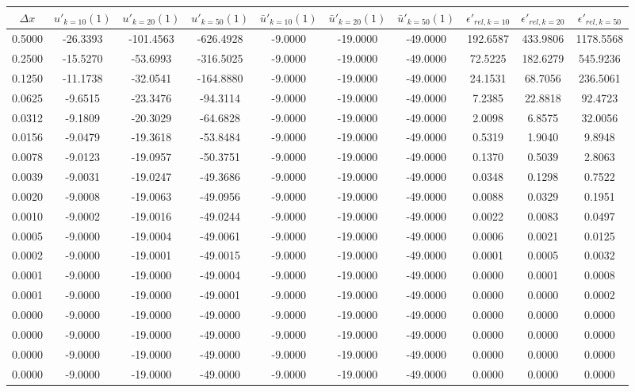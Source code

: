 \begin{tabular}{|c|c|c|c|c|c|c|c|c|c|}
\hline
\textbf{$\Delta x$}&\textbf{$u'_{k=10}(1)$}&\textbf{$u'_{k=20}(1)$}&\textbf{$u'_{k=50}(1)$}&\textbf{$\bar{u}'_{k=10}(1)$}&\textbf{$\bar{u}'_{k=20}(1)$}&\textbf{$\bar{u}'_{k=50}(1)$}&\textbf{$\epsilon'_{rel,k=10}$}&\textbf{$\epsilon'_{rel,k=20}$}&\textbf{$\epsilon'_{rel,k=50}$}\\\hline
0.5000&-26.3393&-101.4563&-626.4928&-9.0000&-19.0000&-49.0000&192.6587&433.9806&1178.5568\\\hline
0.2500&-15.5270&-53.6993&-316.5025&-9.0000&-19.0000&-49.0000&72.5225&182.6279&545.9236\\\hline
0.1250&-11.1738&-32.0541&-164.8880&-9.0000&-19.0000&-49.0000&24.1531&68.7056&236.5061\\\hline
0.0625&-9.6515&-23.3476&-94.3114&-9.0000&-19.0000&-49.0000&7.2385&22.8818&92.4723\\\hline
0.0312&-9.1809&-20.3029&-64.6828&-9.0000&-19.0000&-49.0000&2.0098&6.8575&32.0056\\\hline
0.0156&-9.0479&-19.3618&-53.8484&-9.0000&-19.0000&-49.0000&0.5319&1.9040&9.8948\\\hline
0.0078&-9.0123&-19.0957&-50.3751&-9.0000&-19.0000&-49.0000&0.1370&0.5039&2.8063\\\hline
0.0039&-9.0031&-19.0247&-49.3686&-9.0000&-19.0000&-49.0000&0.0348&0.1298&0.7522\\\hline
0.0020&-9.0008&-19.0063&-49.0956&-9.0000&-19.0000&-49.0000&0.0088&0.0329&0.1951\\\hline
0.0010&-9.0002&-19.0016&-49.0244&-9.0000&-19.0000&-49.0000&0.0022&0.0083&0.0497\\\hline
0.0005&-9.0000&-19.0004&-49.0061&-9.0000&-19.0000&-49.0000&0.0006&0.0021&0.0125\\\hline
0.0002&-9.0000&-19.0001&-49.0015&-9.0000&-19.0000&-49.0000&0.0001&0.0005&0.0032\\\hline
0.0001&-9.0000&-19.0000&-49.0004&-9.0000&-19.0000&-49.0000&0.0000&0.0001&0.0008\\\hline
0.0001&-9.0000&-19.0000&-49.0001&-9.0000&-19.0000&-49.0000&0.0000&0.0000&0.0002\\\hline
0.0000&-9.0000&-19.0000&-49.0000&-9.0000&-19.0000&-49.0000&0.0000&0.0000&0.0000\\\hline
0.0000&-9.0000&-19.0000&-49.0000&-9.0000&-19.0000&-49.0000&0.0000&0.0000&0.0000\\\hline
0.0000&-9.0000&-19.0000&-49.0000&-9.0000&-19.0000&-49.0000&0.0000&0.0000&0.0000\\\hline
0.0000&-9.0000&-19.0000&-49.0000&-9.0000&-19.0000&-49.0000&0.0000&0.0000&0.0000\\\hline
\end{tabular}

